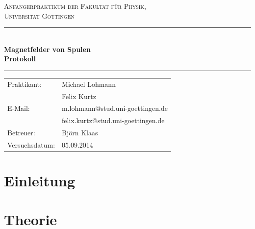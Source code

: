 \documentclass[12pt,a4paper,titlepage,headinclude,bibtotoc]{scrartcl}
\begin{document}
\begin{titlepage}
\centering
\textsc{\Large Anfängerpraktikum der Fakultät für
  Physik,\\[1.5ex] Universität Göttingen}

\vspace*{3.5cm}

\rule{\textwidth}{1pt}\\[0.5cm]
{\huge \bfseries
  Magnetfelder von Spulen\\[1.5ex]
  Protokoll}\\[0.5cm]
\rule{\textwidth}{1pt}

\vspace*{3.5cm}

\begin{Large}
\begin{tabular}{ll}
Praktikant: &  Michael Lohmann\\
 &  Felix Kurtz\\
 E-Mail: & m.lohmann@stud.uni-goettingen.de\\
 &  felix.kurtz@stud.uni-goettingen.de\\
 Betreuer: & Björn Klaas\\
 Versuchsdatum: & 05.09.2014\\
\end{tabular}
\end{Large}

\vspace*{0.8cm}

\begin{Large}
\end{Large}

\end{titlepage}

\tableofcontents

\newpage

\section{Einleitung}
\label{sec:einleitung}
\cite{gerthsen}

\section{Theorie}
\label{sec:theorie}
                                                                                                                                                                      
\end{document}
